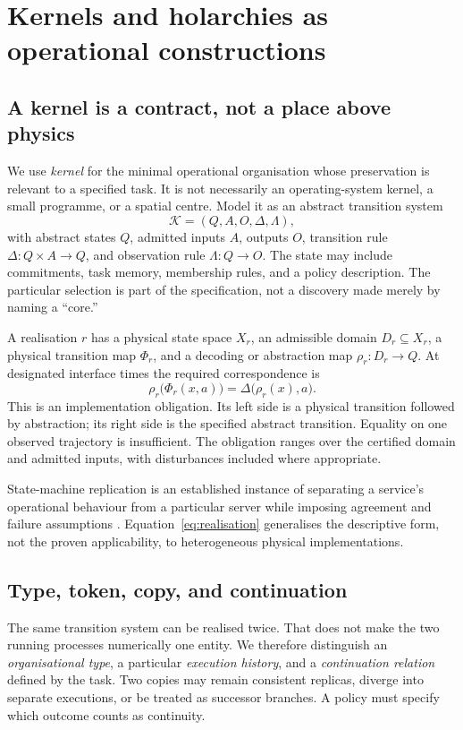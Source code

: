 \documentclass[11pt,a4paper]{article}
\theoremstyle{definition}
\theoremstyle{remark}
\newcommand{\calK}{\mathcal{K}}
\begin{document}
\section{Kernels and holarchies as operational constructions}\label{sec:kernel}
\subsection{A kernel is a contract, not a place above physics}
We use \emph{kernel} for the minimal operational organisation whose preservation is relevant to a specified task. It is not necessarily an operating-system kernel, a small programme, or a spatial centre. Model it as an abstract transition system
\begin{equation}\label{eq:kernel}
 \calK=(Q,A,O,\Delta,\Lambda),
\end{equation}
with abstract states $Q$, admitted inputs $A$, outputs $O$, transition rule $\Delta:Q\times A\to Q$, and observation rule $\Lambda:Q\to O$. The state may include commitments, task memory, membership rules, and a policy description. The particular selection is part of the specification, not a discovery made merely by naming a ``core.''

A realisation $r$ has a physical state space $X_r$, an admissible domain $D_r\subseteq X_r$, a physical transition map $\Phi_r$, and a decoding or abstraction map $\rho_r:D_r\to Q$. At designated interface times the required correspondence is
\begin{equation}\label{eq:realisation}
 \rho_r\bigl(\Phi_r(x,a)\bigr)=\Delta\bigl(\rho_r(x),a\bigr).
\end{equation}
This is an implementation obligation. Its left side is a physical transition followed by abstraction; its right side is the specified abstract transition. Equality on one observed trajectory is insufficient. The obligation ranges over the certified domain and admitted inputs, with disturbances included where appropriate.

State-machine replication is an established instance of separating a service's operational behaviour from a particular server while imposing agreement and failure assumptions \citep{schneider}. Equation~\eqref{eq:realisation} generalises the descriptive form, not the proven applicability, to heterogeneous physical implementations.

\subsection{Type, token, copy, and continuation}
The same transition system can be realised twice. That does not make the two running processes numerically one entity. We therefore distinguish an \emph{organisational type}, a particular \emph{execution history}, and a \emph{continuation relation} defined by the task. Two copies may remain consistent replicas, diverge into separate executions, or be treated as successor branches. A policy must specify which outcome counts as continuity.
\end{document}

